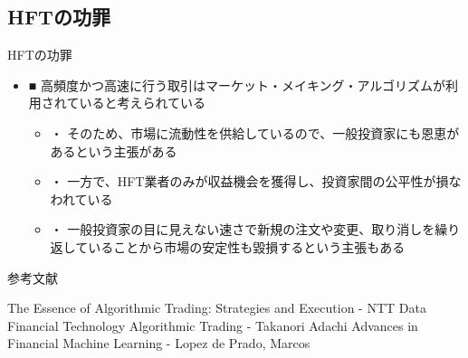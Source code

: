 \documentclass[dvipdfmx, autodetect-engine, aspectratio=169, 10.5pt]{beamer}
\begin{document}
\subsection{HFTの功罪}
\begin{frame}{HFTの功罪}
	\begin{itemize}
		\item ■ 高頻度かつ高速に行う取引はマーケット・メイキング・アルゴリズムが利用されていると考えられている
		      \begin{itemize}
			      \item ・ そのため、市場に流動性を供給しているので、一般投資家にも恩恵があるという主張がある
			      \item ・ 一方で、HFT業者のみが収益機会を獲得し、投資家間の公平性が損なわれている
			      \item ・ 一般投資家の目に見えない速さで新規の注文や変更、取り消しを繰り返していることから市場の安定性も毀損するという主張もある
		      \end{itemize}
	\end{itemize}
\end{frame}

\begin{frame}[allowframebreaks]{参考文献}
	\begin{thebibliography}{9}
		The Essence of Algorithmic Trading: Strategies and Execution - NTT Data Financial Technology
		Algorithmic Trading - Takanori Adachi
		Advances in Financial Machine Learning - Lopez de Prado, Marcos
	\end{thebibliography}
\end{frame}
\end{document}
